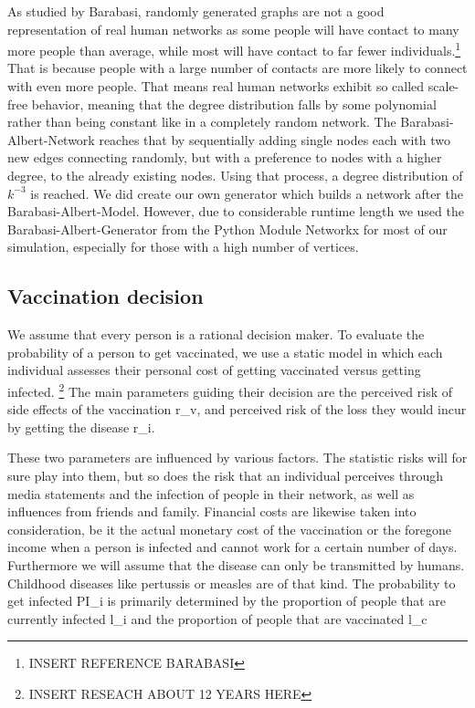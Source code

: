 \documentclass[11pt]{article}
\begin{document}
As studied by Barabasi, randomly generated graphs are not a good representation of real human networks as some people will have contact to many more people than average, while most will have contact to far fewer individuals.\footnote{INSERT REFERENCE BARABASI} That is because people with a large number of contacts are more likely to connect with even more people. That means real human networks exhibit so called scale-free behavior, meaning that the degree distribution falls by some polynomial rather than being constant like in a completely random network. The Barabasi-Albert-Network reaches that by sequentially adding single nodes each with two new edges connecting randomly, but with a preference to nodes with a higher degree, to the already existing nodes. Using that process, a degree distribution of $k^{-3}$ is reached. We did create our own generator which builds a network after the Barabasi-Albert-Model. However, due to considerable runtime length we used the Barabasi-Albert-Generator from the Python Module Networkx for most of our simulation, especially for those with a high number of vertices.
\vspace{14px}


\subsection{Vaccination decision}

We assume that every person is a rational decision maker. To evaluate the probability of a person to get vaccinated, we use a static model in which each individual assesses their personal cost of getting vaccinated versus getting infected.  \footnote{INSERT RESEACH ABOUT 12 YEARS HERE}  The main parameters guiding their decision are the perceived risk of side effects of the vaccination r\_v, and perceived risk of the loss they would incur by getting the disease r\_i.

These two parameters are influenced by various factors. The statistic risks will for sure play into them, but so does the risk that an individual perceives through media statements and
the infection of people in their network, as well as influences from friends and family. Financial costs are likewise taken into consideration, be it the actual monetary cost of the vaccination or the foregone income when a person is infected and cannot work for a certain number of days. Furthermore we will assume that the disease can only be transmitted by humans. Childhood diseases like pertussis or measles are of that kind. 
The probability to get infected PI\_i is primarily determined by the proportion of people that are currently infected l\_i and the proportion of people that are vaccinated l\_c
\end{document}
